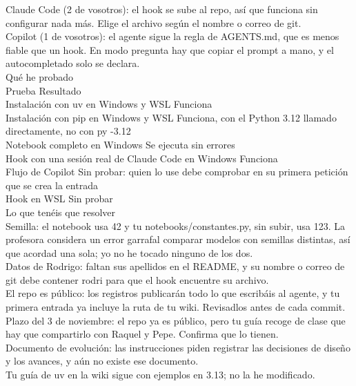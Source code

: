 \documentclass[11pt,a4paper]{article}
\begin{document}
{Claude Code (2 de vosotros): el hook se sube al repo, así que funciona sin configurar nada más. Elige el archivo según el nombre o correo de git. \\{}
Copilot (1 de vosotros): el agente sigue la regla de AGENTS.md, que es menos fiable que un hook. En modo pregunta hay que copiar el prompt a mano, y el autocompletado solo se declara. \\{}
Qué he probado \\{}
Prueba    Resultado \\{}
Instalación con uv en Windows y WSL    Funciona \\{}
Instalación con pip en Windows y WSL    Funciona, con el Python 3.12 llamado directamente, no con py -3.12 \\{}
Notebook completo en Windows    Se ejecuta sin errores \\{}
Hook con una sesión real de Claude Code en Windows    Funciona \\{}
Flujo de Copilot    Sin probar: quien lo use debe comprobar en su primera petición que se crea la entrada \\{}
Hook en WSL    Sin probar \\{}
Lo que tenéis que resolver \\{}
Semilla: el notebook usa 42 y tu notebooks/\allowbreak{}constantes.py, sin subir, usa 123. La profesora considera un error garrafal comparar modelos con semillas distintas, así que acordad una sola; yo no he tocado ninguno de los dos. \\{}
Datos de Rodrigo: faltan sus apellidos en el README, y su nombre o correo de git debe contener rodri para que el hook encuentre su archivo. \\{}
El repo es público: los registros publicarán todo lo que escribáis al agente, y tu primera entrada ya incluye la ruta de tu wiki. Revisadlos antes de cada commit. \\{}
Plazo del 3 de noviembre: el repo ya es público, pero tu guía recoge de clase que hay que compartirlo con Raquel y Pepe. Confirma que lo tienen. \\{}
Documento de evolución: las instrucciones piden registrar las decisiones de diseño y los avances, y aún no existe ese documento. \\{}
Tu guía de uv en la wiki sigue con ejemplos en 3.13; no la he modificado.
}
\end{document}
